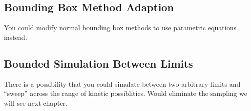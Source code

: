 	\subsection{Bounding Box Method Adaption}

	You could modify normal bounding box methods to use parametric equations instead.

	\subsection{Bounded Simulation Between Limits}

	There is a possibility that you could simulate between two arbitrary limits and ``sweep'' across the range of kinetic possiblities. Would eliminate the sampling we will see next chapter.
